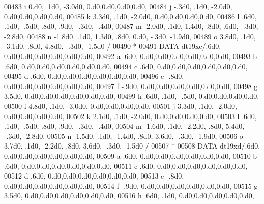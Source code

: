 \begin{DoxyCode}
00483      i           0.d0,    .1d0, -3.0d0,             0.d0,0.d0,0.d0,0.d0,
00484      j           -.3d0,   .1d0, -2.0d0,             0.d0,0.d0,0.d0,0.d0,
00485      k           3.3d0,   .1d0, -2.0d0,             0.d0,0.d0,0.d0,0.d0,
00486      l            .6d0,   .1d0,  -.5d0,   .8d0,   .9d0,  -.3d0,  -.4d0,
00487      m          -2.0d0,   .1d0,  1.4d0,   .8d0,   .6d0,  -.3d0, -2.8d0,
00488      n          -1.8d0,   .1d0,  1.3d0,   .8d0,  0.d0,   -.3d0, -1.9d0,
00489      o           3.8d0,   .1d0, -3.1d0,   .8d0,  4.8d0,  -.3d0, -1.5d0 /
00490 \textcolor{comment}{*}
00491       \textcolor{keyword}{DATA} dt19xc/.6d0,                  0.d0,0.d0,0.d0,0.d0,0.d0,0.d0,
00492      a            .6d0,                  0.d0,0.d0,0.d0,0.d0,0.d0,0.d0,
00493      b            .6d0,                  0.d0,0.d0,0.d0,0.d0,0.d0,0.d0,
00494      c            .6d0,                  0.d0,0.d0,0.d0,0.d0,0.d0,0.d0,
00495      d            .6d0,                  0.d0,0.d0,0.d0,0.d0,0.d0,0.d0,
00496      e           -.8d0,                  0.d0,0.d0,0.d0,0.d0,0.d0,0.d0,
00497      f           -.9d0,                  0.d0,0.d0,0.d0,0.d0,0.d0,0.d0,
00498      g           3.5d0,                  0.d0,0.d0,0.d0,0.d0,0.d0,0.d0,
00499      h            .6d0,   .1d0,  -.5d0,             0.d0,0.d0,0.d0,0.d0,
00500      i           4.8d0,   .1d0, -3.0d0,             0.d0,0.d0,0.d0,0.d0,
00501      j           3.3d0,   .1d0, -2.0d0,             0.d0,0.d0,0.d0,0.d0,
00502      k           2.1d0,   .1d0, -2.0d0,             0.d0,0.d0,0.d0,0.d0,
00503      l            .6d0,   .1d0,  -.5d0,   .8d0,   .9d0,  -.3d0,  -.4d0,
00504      m          -1.6d0,   .1d0, -2.2d0,   .8d0,  5.4d0,  -.3d0, -2.8d0,
00505      n          -1.5d0,   .1d0, -1.4d0,   .8d0,  3.6d0,  -.3d0, -1.9d0,
00506      o           3.7d0,   .1d0, -2.2d0,   .8d0,  3.6d0,  -.3d0, -1.5d0 /
00507 \textcolor{comment}{*}
00508       \textcolor{keyword}{DATA} dt19xd/.6d0,                  0.d0,0.d0,0.d0,0.d0,0.d0,0.d0,
00509      a            .6d0,                  0.d0,0.d0,0.d0,0.d0,0.d0,0.d0,
00510      b            .6d0,                  0.d0,0.d0,0.d0,0.d0,0.d0,0.d0,
00511      c            .6d0,                  0.d0,0.d0,0.d0,0.d0,0.d0,0.d0,
00512      d            .6d0,                  0.d0,0.d0,0.d0,0.d0,0.d0,0.d0,
00513      e           -.8d0,                  0.d0,0.d0,0.d0,0.d0,0.d0,0.d0,
00514      f           -.9d0,                  0.d0,0.d0,0.d0,0.d0,0.d0,0.d0,
00515      g           3.5d0,                  0.d0,0.d0,0.d0,0.d0,0.d0,0.d0,
00516      h            .6d0,   .1d0,             0.d0,0.d0,0.d0,0.d0,0.d0,

\end{DoxyCode}
